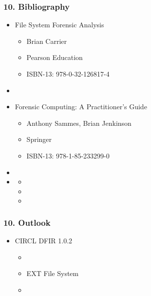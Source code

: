 \begin{frame}
  \frametitle{10. Bibliography}
  \begin{itemize}
      \item File System Forensic Analysis
        \begin{itemize}
            \item[] Brian Carrier
            \item[] Pearson Education
            \item[] ISBN-13: 978-0-32-126817-4
        \end{itemize}
      \item[]
      \item Forensic Computing: A Practitioner’s Guide
        \begin{itemize}
            \item[] Anthony Sammes, Brian Jenkinson
            \item[] Springer
            \item[] ISBN-13: 978-1-85-233299-0
        \end{itemize}
      \item[]
      \item[] 
        \begin{itemize}
            \item[]
            \item[]
            \item[] 
        \end{itemize}
  \end{itemize}
\end{frame}


\begin{frame}
  \frametitle{10. Outlook}
  \begin{itemize}
      \item[] CIRCL DFIR 1.0.2
      \begin{itemize}
          \item[]
          \item[] EXT File System
          \item[]
      \end{itemize}
  \end{itemize}
\end{frame}

